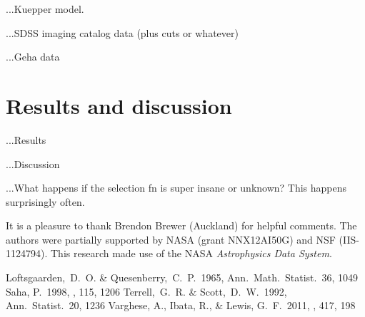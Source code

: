 \documentclass[12pt,pdftex,preprint]{aastex}
\begin{document}
...Kuepper model.

...SDSS imaging catalog data (plus cuts or whatever)

...Geha data

\section{Results and discussion}

...Results

...Discussion

...What happens if the selection fn is super insane or unknown?  This
happens surprisingly often.

\acknowledgements It is a pleasure to thank
  Brendon Brewer (Auckland)
for helpful comments.  The authors were partially supported by NASA
(grant NNX12AI50G) and NSF (IIS-1124794).  This research made use of
the NASA \textsl{Astrophysics Data System}.

\begin{thebibliography}{}
  Loftsgaarden,~D.~O. \& Quesenberry,~C.~P.\ 1965, Ann.\ Math.\ Statist.\ 36, 1049
  Saha, P.\ 1998, \aj, 115, 1206 
  Terrell,~G.~R. \& Scott,~D.~W.\ 1992, Ann.\ Statist.\ 20, 1236
  Varghese, A., Ibata, R., \& Lewis, G.~F.\ 2011, \mnras, 417, 198 
\end{thebibliography}
\end{document}
